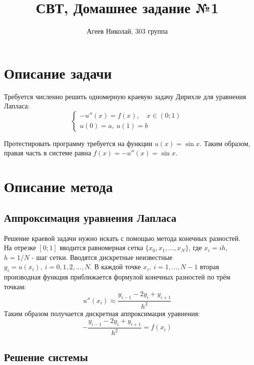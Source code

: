 \documentclass{article}
\title{СВТ, Домашнее задание №1}
\author{Агеев Николай, 303 группа}
\begin{document}
\maketitle

\section{Описание задачи}

Требуется численно решить одномерную краевую задачу Дирихле для уравнения Лапласа:
$$
\begin{cases}
-u''(x) = f(x), \quad x \in (0; 1) \\
u(0) = a, \: u(1) = b
\end{cases}
$$

Протестировать программу требуется на функции $u(x) = \sin x$. Таким образом, правая часть в системе равна $f(x) = -u''(x) = \sin x$.

\section{Описание метода}

\subsection{Аппроксимация уравнения Лапласа}

Решение краевой задачи нужно искать с помощью метода конечных разностей. 
На отрезке $[0; 1]$ вводится равномерная сетка $\{x_0, x_1, \ldots, x_N\}$, где $x_i = ih$, $h = 1 / N$ - шаг сетки. Вводятся дискретные неизвестные $y_i = u(x_i), \ i = 0, 1, 2, ... , N$. В каждой точке $x_i, \ i = 1, ... , N - 1$ вторая производная функция приближается формулой конечных разностей по трём точкам:
$$
u''(x_i) \approx \frac{y_{i - 1} - 2y_i + y_{i + 1}}{h^2}
$$
Таким образом получается дискретная аппроксимация уравнения:
$$
-\frac{y_{i - 1} - 2y_i + y_{i + 1}}{h^2} = f(x_i)
$$

\subsection{Решение системы}
\end{document}
